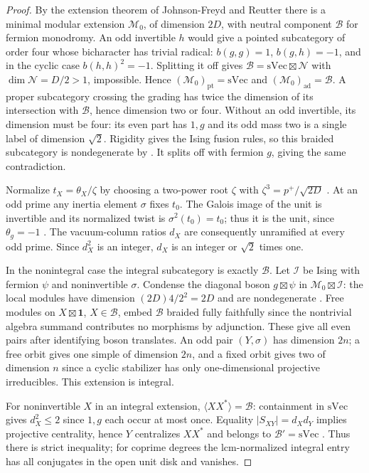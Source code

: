 \documentclass[11pt,a4paper]{article}
\numberwithin{equation}{section}
\theoremstyle{remark}
\newcommand{\M}{\mathcal M}
\newcommand{\one}{\mathbf1}
\newcommand{\ad}{\mathrm{ad}}
\newcommand{\pt}{\mathrm{pt}}
\newcommand{\sVec}{\mathrm{sVec}}
\begin{document}
\begin{proof}
By the extension theorem of Johnson-Freyd and Reutter \cite[Corollary~1.3]{JFR} there is a minimal modular extension
$\M_0$, of dimension $2D$, with neutral component $\mathcal B$
for fermion monodromy. An odd invertible $h$ would give a pointed
subcategory of order four whose bicharacter has trivial radical:
$b(g,g)=1$, $b(g,h)=-1$, and in the cyclic case $b(h,h)^2=-1$.
Splitting it off gives $\mathcal B=\sVec\boxtimes\mathcal N$ with
$\dim\mathcal N=D/2>1$, impossible. Hence
$(\M_0)_{\pt}=\sVec$ and $(\M_0)_{\ad}=\mathcal B$.
A proper subcategory crossing the grading has twice the dimension
of its intersection with $\mathcal B$, hence dimension two or four.
Without an odd invertible, its dimension must be four: its even part has $1,g$ and its odd mass two is a single label of dimension $\sqrt2$. Rigidity gives the Ising fusion rules, so this braided subcategory is nondegenerate by \cite[Corollary~B.12]{DGNO}. It splits off with fermion $g$, giving the same contradiction.

Normalize $t_X=\theta_X/\zeta$ by choosing a two-power root
$\zeta$ with $\zeta^3=p^+/\sqrt{2D}$ \cite[Theorem~6.10]{DLNCongruence}.
At an odd prime any inertia element $\sigma$ fixes $t_0$.
The Galois image of the unit is invertible and its normalized twist
is $\sigma^2(t_0)=t_0$; thus it is the unit, since $\theta_g=-1$
\cite[Theorem~II]{DLNCongruence}. The vacuum-column ratios $d_X$
are consequently unramified at every odd prime. Since $d_X^2$ is an
integer, $d_X$ is an integer or $\sqrt2$ times one.

In the nonintegral case the integral subcategory is exactly
$\mathcal B$. Let $\mathcal I$ be Ising with fermion $\psi$ and
noninvertible $\sigma$. Condense the diagonal boson
$g\boxtimes\psi$ in $\M_0\boxtimes\mathcal I$: the local modules
have dimension $(2D)4/2^2=2D$ and are nondegenerate
\cite[Propositions~4.26, 4.55(i) and~4.56(i)--(ii)]{DGNO}. Free modules on $X\boxtimes\one$,
$X\in\mathcal B$, embed $\mathcal B$ braided fully faithfully since
the nontrivial algebra summand contributes no morphisms by adjunction.
These give all even pairs after identifying boson translates.
An odd pair $(Y,\sigma)$ has dimension $2n$; a free orbit gives
one simple of dimension $2n$, and a fixed orbit gives two of dimension
$n$ since a cyclic stabilizer has only one-dimensional projective
irreducibles. This extension is integral.

For noninvertible $X$ in an integral extension,
$\langle XX^*\rangle=\mathcal B$: containment in $\sVec$ gives
$d_X^2\le2$ since $1,g$ each occur at most once.
Equality $|S_{XY}|=d_Xd_Y$ implies projective centrality, hence $Y$ centralizes $XX^*$ and belongs to $\mathcal B'=\sVec$ \cite[Proposition~8.22.5 and Lemma~9.15.1]{EGNO}. Thus there is strict inequality; for coprime degrees the lcm-normalized integral entry has all conjugates in the open unit disk and vanishes.


\end{proof}
\end{document}
